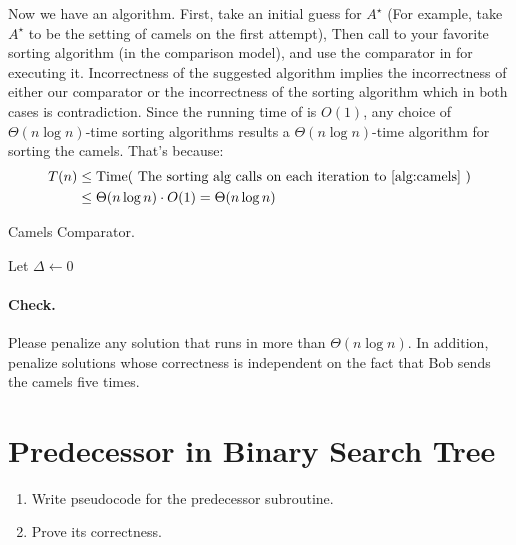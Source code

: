   Now we have an algorithm. First, take an initial guess for $A^{\star}$ (For example, take $A^{\star}$ to be the setting of camels on the first attempt), Then call to your favorite sorting algorithm (in the comparison model), and use the comparator in  for executing it. Incorrectness of the suggested algorithm implies the incorrectness of either our comparator or the incorrectness of the sorting algorithm which in both cases is contradiction. Since the running time of  is $O(1)$, any choice of $\Theta(n\log n)$-time sorting algorithms results a $\Theta(n\log n)$-time algorithm for sorting the camels. That's because:   
  \begin{equation*}
    \begin{split}
      T(n) & \le \text{Time} ( \text{ The sorting alg calls on each iteration to \Cref{alg:camels} } ) \\ 
      & \le \Theta( n \log n) \cdot O(1)  = \Theta(n\log n)
    \end{split}
  \end{equation*}


   \begin{algorithm}
\caption{Camels Comparator.} \label{alg:camels}
     Let $\Delta \leftarrow 0$ \\
      {
     }
\end{algorithm}
\ifdefined\CHECK

  \paragraph{Check.} Please penalize any solution that runs in more than $\Theta(n\log n)$. In addition, penalize solutions whose correctness is independent on the fact that Bob sends the camels five times.
\fi



\fi

\section{Predecessor in Binary Search Tree}
\begin{enumerate}
  \item Write pseudocode for the predecessor subroutine.
  \item Prove its correctness.
\end{enumerate}
\ifdefined\SOLUTION
